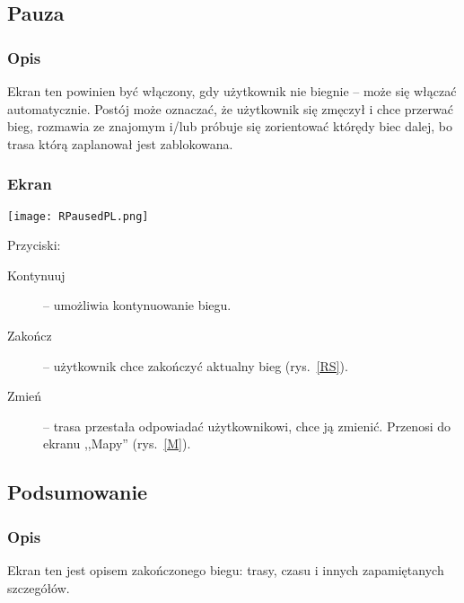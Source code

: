 \subsection{Pauza}
\subsubsection{Opis}
\noindent Ekran ten powinien być włączony, gdy użytkownik nie biegnie -- może się włączać automatycznie. Postój może oznaczać, że użytkownik się zmęczył i chce przerwać bieg, rozmawia ze znajomym i/lub próbuje się zorientować którędy biec dalej, bo trasa którą zaplanował jest zablokowana.
\subsubsection{Ekran}
\begin{minipage}{0.5\textwidth}
  \label{RP}
  \texttt{[image: RPausedPL.png]}
\end{minipage}
\begin{minipage}{0.5\textwidth}
Przyciski:\\
\begin{description}
  \item[Kontynuuj] -- umożliwia kontynuowanie biegu.
  \item[Zakończ] -- użytkownik chce zakończyć aktualny bieg (rys.~\ref{RS}).
  \item[Zmień] -- trasa przestała odpowiadać użytkownikowi, chce ją zmienić. Przenosi do ekranu ,,Mapy'' (rys.~\ref{M}).
\end{description}
\end{minipage}
\subsection{Podsumowanie}
\subsubsection{Opis}
\noindent Ekran ten jest opisem zakończonego biegu: trasy, czasu i innych zapamiętanych szczegółów.
